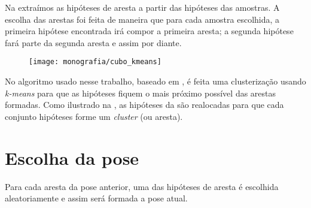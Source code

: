 Na  extraímos as hipóteses de aresta a partir das hipóteses das amostras. A escolha das arestas foi feita de maneira que para cada amostra escolhida, a primeira hipótese encontrada irá compor a primeira aresta; a segunda hipótese fará parte da segunda aresta e assim por diante.

\begin{figure}[ht!]
\centering
\texttt{[image: monografia/cubo\_kmeans]}
\caption{}
\label{cubo_kmeans}
\end{figure}

No algoritmo usado nesse trabalho, baseado em \cite{celine}, é feita uma clusterização usando \emph{k-means} para que as hipóteses fiquem o mais próximo possível das arestas formadas. Como ilustrado na , as hipóteses da  são realocadas para que cada conjunto hipóteses forme um \emph{cluster} (ou aresta).

\section{Escolha da pose}

Para cada aresta da pose anterior, uma das hipóteses de aresta é escolhida aleatoriamente e assim será formada a pose atual.

\begin{comment}
\section{A FAZER}

\begin{enumerate}
\item Descrever o moving-edges. Mostrar que com múltiplas hipóteses a $n$-ésima hipótese de ponto vai corresponder à $n$-ésima hipótese de aresta.
\item Falar sobre \cite{celine}. As hipóteses de pontos vão formar arestas tal que elas fiquem as mais paralelas possíveis da aresta da cena atual.
\item colocar figuras para ilustrar
\end{enumerate}
\end{comment}
